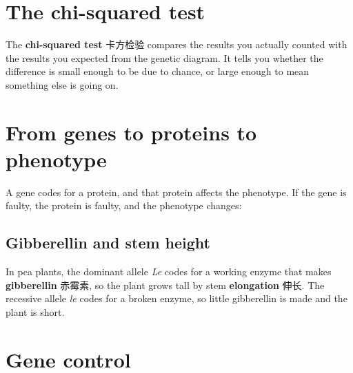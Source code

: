 \documentclass[11pt]{article}
\begin{document}
\section*{The chi-squared test}

The \textbf{chi-squared test} 卡方检验 compares the results you actually counted with the results you expected from the genetic diagram. It tells you whether the difference is small enough to be due to chance, or large enough to mean something else is going on.

\section*{From genes to proteins to phenotype}

A gene codes for a protein, and that protein affects the phenotype. If the gene is faulty, the protein is faulty, and the phenotype changes:

\begin{center}
\end{center}

\subsection*{Gibberellin and stem height}

In pea plants, the dominant allele \emph{Le} codes for a working enzyme that makes \textbf{gibberellin} 赤霉素, so the plant grows tall by stem \textbf{elongation} 伸长. The recessive allele \emph{le} codes for a broken enzyme, so little gibberellin is made and the plant is short.

\section*{Gene control}
\end{document}
